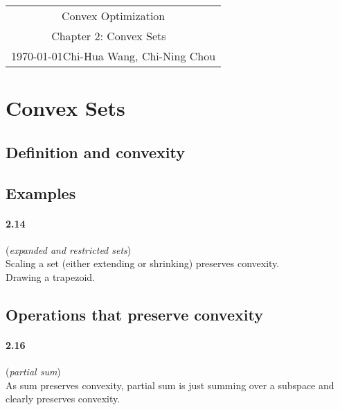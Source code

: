 \documentclass[11pt]{article}
\newcommand{\scribe}{Chi-Hua Wang, Chi-Ning Chou}
\newcommand{\lecnum}{2}
\newcommand{\lecname}{Convex Sets}
\newcommand{\lecdate}{\today}
\begin{document}
	
\begin{center}
	\renewcommand{\arraystretch}{2}
	\begin{bfseries}
		\begin{tabular}{c}
			\vspace{0.5cm}
			\Huge Convex Optimization\\
			\vspace{0.5cm}
			\hspace{10em} {\Large Chapter \lecnum: \lecname} \hspace{10em}\ \\
			\lecdate \hfill \scribe\\
			\hline
		\end{tabular}
		\renewcommand{\arraystretch}{1}
	\end{bfseries}
\end{center}

\section{Convex Sets}

\subsection{Definition and convexity}


\subsection{Examples}

\paragraph{2.14} ({\it expanded and restricted sets})\\
\concept Scaling a set (either extending or shrinking) preserves convexity.\\
\proofidea Drawing a trapezoid. 


\subsection{Operations that preserve convexity}
\paragraph{2.16} ({\it partial sum})\\
\concept As sum preserves convexity, partial sum is just summing over a subspace and clearly preserves convexity.
\end{document}
